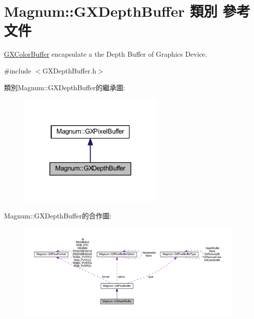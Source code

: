 \hypertarget{class_magnum_1_1_g_x_depth_buffer}{}\section{Magnum\+:\+:G\+X\+Depth\+Buffer 類別 參考文件}
\label{class_magnum_1_1_g_x_depth_buffer}


\hyperlink{class_magnum_1_1_g_x_color_buffer}{G\+X\+Color\+Buffer} encapsulate a the Depth Buffer of Graphics Device.  




{\ttfamily \#include $<$G\+X\+Depth\+Buffer.\+h$>$}



類別\+Magnum\+:\+:G\+X\+Depth\+Buffer的繼承圖\+:\nopagebreak
\begin{figure}[H]
\begin{center}
\leavevmode
\includegraphics[width=203pt]{class_magnum_1_1_g_x_depth_buffer__inherit__graph}
\end{center}
\end{figure}


Magnum\+:\+:G\+X\+Depth\+Buffer的合作圖\+:\nopagebreak
\begin{figure}[H]
\begin{center}
\leavevmode
\includegraphics[width=350pt]{class_magnum_1_1_g_x_depth_buffer__coll__graph}
\end{center}
\end{figure}
